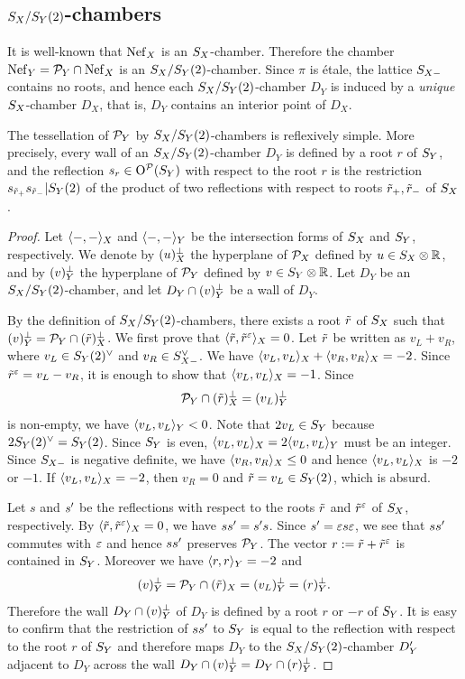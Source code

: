 \documentclass{amsart}
\numberwithin{procedure}{section}
\begin{document}
\subsection{$S_{X}/S_{Y}(2)$-chambers}\label{subsec:SYSY2chambers} 
%
It is well-known that  $\mathord{\rm Nef}_{X}$ is  
an $S_{X}$-chamber.
Therefore the chamber $\mathord{\rm Nef}_{Y}=\mathord{\mathcal P}_Y\cap \mathord{\rm Nef}_{X}$ is an $S_{X}/S_{Y}(2)$-chamber.
Since $\pi$ is \'etale, the lattice $S_{X-}$  contains no roots, and hence 
each $S_{X}/S_{Y}(2)$-chamber $D_Y$ is induced by a \emph{unique} $S_{X}$-chamber $D_X$,
that is,  $D_Y$ contains an interior point of $D_X$.
%
%
\begin{proposition}\label{prop:SXSY2simple}
The tessellation of $\mathord{\mathcal P}_Y$  by $S_{X}/S_{Y}(2)$-chambers is reflexively simple.
More precisely,
every wall of an $S_{X}/S_{Y}(2)$-chamber $D_Y$ is defined by a root $r$ of $S_{Y}$,
and the reflection $s_r\in \mathord{\mathrm{O}}^{\mathord{\mathcal P}}(S_{Y})$ with respect to the root $r$ 
is the restriction $s_{\tilde{r}_+} s_{\tilde{r}_-}|S_{Y}(2)$ of the product 
of two reflections with respect to roots $\tilde{r}_+, \tilde{r}_-$ of $S_{X}$.
\end{proposition}
%
\begin{proof}
Let $\langle -,- \rangle_X$ and $\langle -,- \rangle_Y$ be the intersection forms of $S_{X}$ and $S_{Y}$,
respectively.
We denote by $(u)\sp{\perp}_X$ the hyperplane of $\mathord{\mathcal P}_X$
defined by $u\in S_{X}\otimes\mathord{\mathbb R}$,
and by $(v)\sp{\perp}_Y$ the hyperplane of $\mathord{\mathcal P}_Y$
defined by $v\in S_{Y}\otimes\mathord{\mathbb R}$.
Let  $D_Y$ be an $S_{X}/S_{Y}(2)$-chamber,
and let $D_Y \cap (v)\sp{\perp}_Y$ be a wall of $D_Y$.
\par
By the definition of $S_{X}/S_{Y}(2)$-chambers,
there exists a root $\tilde{r}$ of $S_{X}$
such that
$(v)_Y\sp{\perp}=\mathord{\mathcal P}_Y\cap (\tilde{r})_X\sp{\perp}$.
We first prove that  $\langle \tilde{r}, \tilde{r}^{\varepsilon} \rangle_X=0$.
Let $\tilde{r}$ be written as $v_L+v_R$,
where $v_L\in S_{Y}(2)\sp{\vee}$ and $v_R\in S_{X-}\sp{\vee}$.
We have $\langle v_L, v_L \rangle_X+\langle v_R, v_R \rangle_X=-2$.
Since $\tilde{r}^{\varepsilon}=v_L-v_R$,
it is enough to show that $\langle v_L, v_L \rangle_X=-1$.
Since 
\[
\mathord{\mathcal P}_Y\cap (\tilde{r})_X\sp{\perp}=(v_L)_Y\sp{\perp}
\]
is non-empty,
we have $\langle v_L, v_L \rangle_Y<0$.
Note that
$2 v_L\in S_{Y}$ because $2S_{Y}(2)\sp{\vee}=S_{Y}(2)$.
Since  $S_{Y}$ is even,
 $\langle v_L, v_L \rangle_X=2\langle v_L, v_L \rangle_Y$ must be an integer.
Since $S_{X-}$ is negative definite,
we have $\langle v_R, v_R \rangle_X\le 0$ and hence $\langle v_L, v_L \rangle_X$ is $-2$ or $-1$.
If $\langle v_L, v_L \rangle_X=-2$, then $v_R=0$ and $\tilde{r}=v_L\in S_{Y}(2)$,
which is absurd.
\par
Let $s$ and $s\sp\prime$ be the reflections with respect to the roots
$\tilde{r}$ and $\tilde{r}^{\varepsilon}$ of $S_{X}$, respectively.
By $\langle \tilde{r}, \tilde{r}^{\varepsilon} \rangle_X=0$,
we have $s s\sp\prime=s\sp\prime s$.
Since $s\sp\prime=\varepsilon s \varepsilon$,
we see that $ss\sp\prime$ commutes with $\varepsilon$ and hence 
$ss\sp\prime$ preserves $\mathord{\mathcal P}_Y$.
The vector $r:=\tilde{r}+\tilde{r}^{\varepsilon}$ is contained in $S_{Y}$.
Moreover we have $\langle r, r \rangle_Y=-2$ and
\[
(v)_Y\sp{\perp}=\mathord{\mathcal P}_Y\cap (\tilde{r})_X=(v_L)_Y\sp{\perp}=(r)_Y\sp{\perp}.
\]
Therefore the wall 
$D_Y \cap (v)\sp{\perp}_Y$ of $D_Y$ is defined by a root $r$ or $-r$ of $S_{Y}$.
It is easy to confirm  that the restriction of $ss\sp\prime$ to $S_{Y}$ is equal
to the reflection with respect to the root $r$ of $S_{Y}$ and therefore
maps $D_Y$
to the $S_{X}/S_{Y}(2)$-chamber $D\sp\prime_Y$ adjacent to $D_Y$ across
the wall $D_Y\cap (v)_Y\sp{\perp}=D_Y\cap (r)_Y\sp{\perp}$.
\end{proof}
%
%
\end{document}
